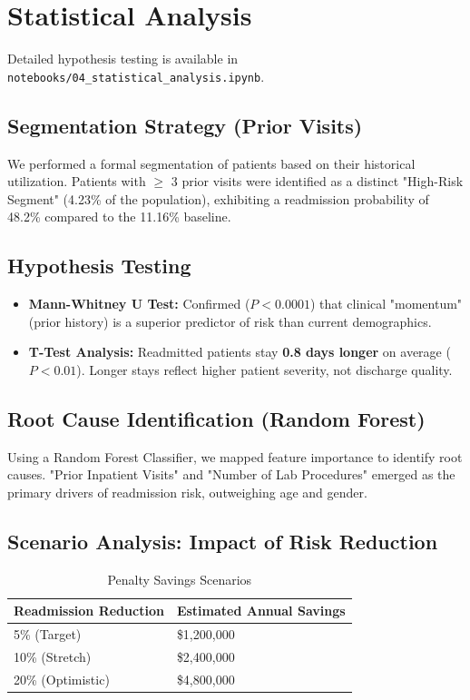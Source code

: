 \documentclass[12pt,a4paper]{article}
\begin{document}
\section{Statistical Analysis}
Detailed hypothesis testing is available in \texttt{notebooks/04\_statistical\_analysis.ipynb}.

\subsection{Segmentation Strategy (Prior Visits)}
We performed a formal segmentation of patients based on their historical utilization. Patients with $\ge$ 3 prior visits were identified as a distinct "High-Risk Segment" (4.23\% of the population), exhibiting a readmission probability of 48.2\% compared to the 11.16\% baseline.

\subsection{Hypothesis Testing}
\begin{itemize}
    \item \textbf{Mann-Whitney U Test:} Confirmed ($P < 0.0001$) that clinical "momentum" (prior history) is a superior predictor of risk than current demographics.
    \item \textbf{T-Test Analysis:} Readmitted patients stay \textbf{0.8 days longer} on average ($P < 0.01$). Longer stays reflect higher patient severity, not discharge quality.
\end{itemize}

\subsection{Root Cause Identification (Random Forest)}
Using a Random Forest Classifier, we mapped feature importance to identify root causes. "Prior Inpatient Visits" and "Number of Lab Procedures" emerged as the primary drivers of readmission risk, outweighing age and gender.

\subsection{Scenario Analysis: Impact of Risk Reduction}
\begin{table}[h]
    \centering
    \begin{tabular}{ll}
        \toprule
        \textbf{Readmission Reduction} & \textbf{Estimated Annual Savings} \\
        \midrule
        5\% (Target) & \$1,200,000 \\
        10\% (Stretch) & \$2,400,000 \\
        20\% (Optimistic) & \$4,800,000 \\
        \bottomrule
    \end{tabular}
    \caption{Penalty Savings Scenarios}
\end{table}
\end{document}
